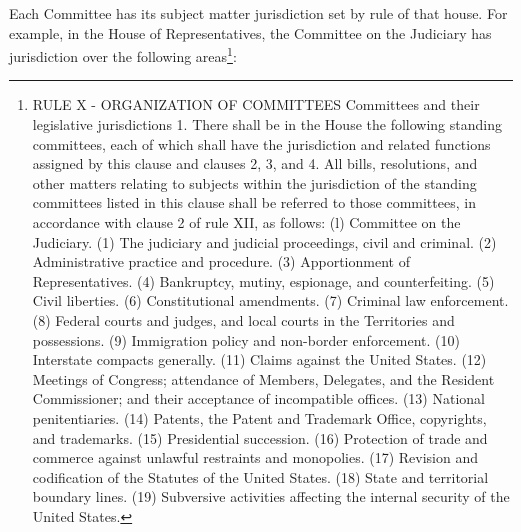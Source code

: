 Each Committee has its subject matter jurisdiction set by rule of that house.
For example, in the House of Representatives, the Committee on the Judiciary has jurisdiction over the following areas\footnote{RULE X - ORGANIZATION OF COMMITTEES
Committees and their legislative jurisdictions
1. There shall be in the House the following standing committees, each of which shall have the jurisdiction and related functions assigned by this clause and clauses 2, 3, and 4. All bills, resolutions, and other matters relating to subjects within the jurisdiction of the standing committees listed in this clause shall be referred to those committees, in accordance with clause 2 of rule XII, as follows:
(l) Committee on the Judiciary. (1) The judiciary and judicial proceedings, civil and criminal. (2) Administrative practice and procedure. (3) Apportionment of Representatives. (4) Bankruptcy, mutiny, espionage, and counterfeiting. (5) Civil liberties. (6) Constitutional amendments. (7) Criminal law enforcement. (8) Federal courts and judges, and local courts in the Territories and possessions. (9) Immigration policy and non-border enforcement. (10) Interstate compacts generally. (11) Claims against the United States. (12) Meetings of Congress; attendance of Members, Delegates, and the Resident Commissioner; and their acceptance of incompatible offices. (13) National penitentiaries. (14) Patents, the Patent and Trademark Office, copyrights, and trademarks. (15) Presidential succession. (16) Protection of trade and commerce against unlawful restraints and monopolies. (17) Revision and codification of the Statutes of the United States. (18) State and territorial boundary lines. (19) Subversive activities affecting the internal security of the United States.}:

